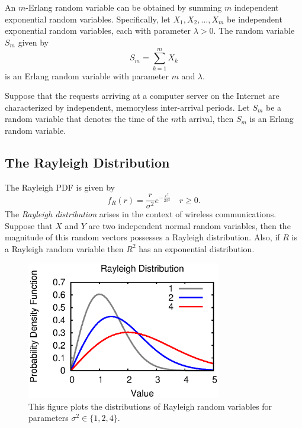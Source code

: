 An $m$-Erlang random variable can be obtained by summing $m$ independent exponential random variables.
Specifically, let $X_1, X_2, \ldots, X_m$ be independent exponential random variables, each with parameter $\lambda > 0$.
The random variable $S_m$ given by
\begin{equation*}
S_m = \sum_{k=1}^m X_k
\end{equation*}
is an Erlang random variable with parameter $m$ and $\lambda$.

\begin{example}
Suppose that the requests arriving at a computer server on the Internet are characterized by independent, memoryless inter-arrival periods.
Let $S_m$ be a random variable that denotes the time of the $m$th arrival, then $S_m$ is an Erlang  random variable.
\end{example}


\subsection{The Rayleigh Distribution}

The Rayleigh PDF is given by 
\begin{equation*}
f_R (r) = \frac{r}{\sigma^2} e^{- \frac{r^2}{2 \sigma^2} } \quad r \geq 0 .
\end{equation*}
The \emph{Rayleigh distribution} arises in the context of wireless communications.
Suppose that $X$ and $Y$ are two independent normal random variables, then the magnitude of this random vectors possesses a Rayleigh distribution.
Also, if $R$ is a Rayleigh random variable then $R^2$ has an exponential distribution.

\begin{figure}[ht]
\begin{center}
\includegraphics[width=8.5cm]{Figures/8chapter/rayleigh_pdf}
\end{center}
\caption{This figure plots the distributions of Rayleigh random variables for parameters $\sigma^2 \in \{ 1, 2, 4 \}$.}
\end{figure}

